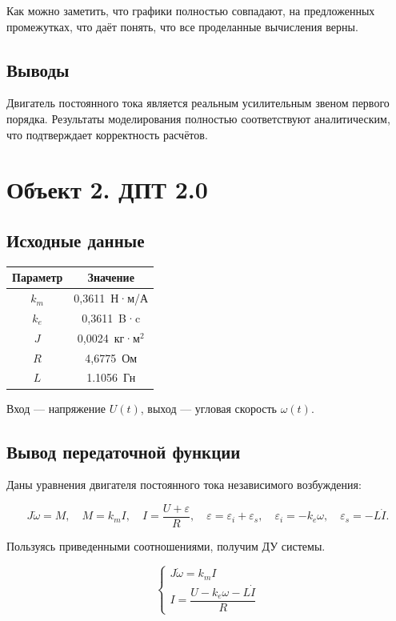 \documentclass[a5paper, 10pt]{article}
\theoremstyle{definition}
\theoremstyle{plain}
\theoremstyle{remark}
\begin{document}
Как можно заметить, что графики полностью совпадают, на предложенных промежутках, что даёт понять, что все проделанные вычисления верны.

\subsection{Выводы}

Двигатель постоянного тока является реальным усилительным звеном первого порядка. Результаты моделирования полностью соответствуют аналитическим, что подтверждает корректность расчётов.


\section{Объект 2. ДПТ 2.0}

\subsection{Исходные данные}
\begin{center}
\begin{tabular}{|c|c|}
\hline
Параметр & Значение \\ \hline
$k_m$ & 0,3611 \,Н·м/А \\ \hline
$k_e$&0,3611 \,B·c \\ \hline
$J$ & 0,0024 \,кг·м$^2$ \\ \hline
$R$ & 4,6775 \,Ом \\ \hline
$L$ & 1.1056 \,Гн \\ \hline
\end{tabular}
\end{center}

Вход — напряжение $U(t)$, выход — угловая скорость $\omega(t)$.

\subsection{Вывод передаточной функции}

Даны уравнения двигателя постоянного тока независимого возбуждения:

\[
J\dot{\omega} = M, \quad 
M = k_m I, \quad 
I = \frac{U + \varepsilon}{R}, \quad 
\varepsilon = \varepsilon_i + \varepsilon_s, \quad 
\varepsilon_i = -k_e \omega, \quad 
\varepsilon_s = -L \dot{I}.
\]

Пользуясь приведенными соотношениями, получим ДУ системы.

\[
\begin{cases} 
J\dot{\omega} = k_m I \\ 
I = \dfrac{U - k_e \omega - L\dot{I}}{R} 
\end{cases}
\]
\end{document}
